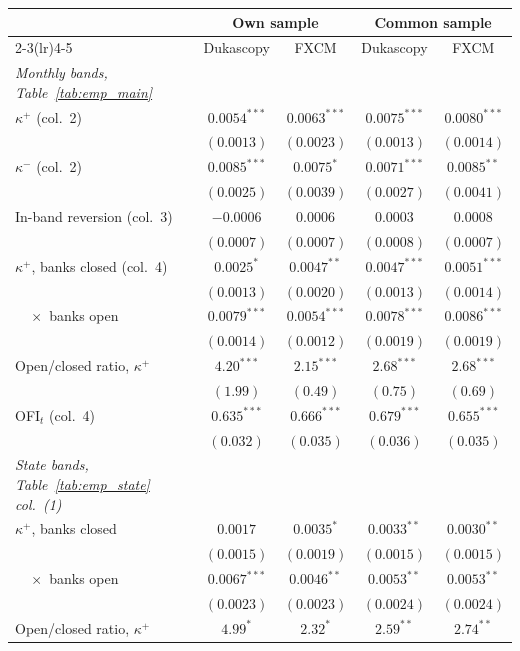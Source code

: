 \begin{tabular}{lcccc}
\toprule
 & \multicolumn{2}{c}{Own sample} & \multicolumn{2}{c}{Common sample} \\
\cmidrule(lr){2-3}\cmidrule(lr){4-5}
 & Dukascopy & FXCM & Dukascopy & FXCM \\
\midrule
\emph{Monthly bands, Table~\ref{tab:emp_main}} & & & & \\
$\kappa^+$ (col.\ 2) & $0.0054^{***}$ & $0.0063^{***}$ & $0.0075^{***}$ & $0.0080^{***}$ \\
 & $(0.0013)$ & $(0.0023)$ & $(0.0013)$ & $(0.0014)$ \\
$\kappa^-$ (col.\ 2) & $0.0085^{***}$ & $0.0075^{*}$ & $0.0071^{***}$ & $0.0085^{**}$ \\
 & $(0.0025)$ & $(0.0039)$ & $(0.0027)$ & $(0.0041)$ \\
In-band reversion (col.\ 3) & $-0.0006$ & $0.0006$ & $0.0003$ & $0.0008$ \\
 & $(0.0007)$ & $(0.0007)$ & $(0.0008)$ & $(0.0007)$ \\
$\kappa^+$, banks closed (col.\ 4) & $0.0025^{*}$ & $0.0047^{**}$ & $0.0047^{***}$ & $0.0051^{***}$ \\
 & $(0.0013)$ & $(0.0020)$ & $(0.0013)$ & $(0.0014)$ \\
$\quad\times$ banks open & $0.0079^{***}$ & $0.0054^{***}$ & $0.0078^{***}$ & $0.0086^{***}$ \\
 & $(0.0014)$ & $(0.0012)$ & $(0.0019)$ & $(0.0019)$ \\
Open/closed ratio, $\kappa^+$ & $4.20^{***}$ & $2.15^{***}$ & $2.68^{***}$ & $2.68^{***}$ \\
 & $(1.99)$ & $(0.49)$ & $(0.75)$ & $(0.69)$ \\
OFI$_t$ (col.\ 4) & $0.635^{***}$ & $0.666^{***}$ & $0.679^{***}$ & $0.655^{***}$ \\
 & $(0.032)$ & $(0.035)$ & $(0.036)$ & $(0.035)$ \\
\emph{State bands, Table~\ref{tab:emp_state} col.\ (1)} & & & & \\
$\kappa^+$, banks closed & $0.0017$ & $0.0035^{*}$ & $0.0033^{**}$ & $0.0030^{**}$ \\
 & $(0.0015)$ & $(0.0019)$ & $(0.0015)$ & $(0.0015)$ \\
$\quad\times$ banks open & $0.0067^{***}$ & $0.0046^{**}$ & $0.0053^{**}$ & $0.0053^{**}$ \\
 & $(0.0023)$ & $(0.0023)$ & $(0.0024)$ & $(0.0024)$ \\
Open/closed ratio, $\kappa^+$ & $4.99^{*}$ & $2.32^{*}$ & $2.59^{**}$ & $2.74^{**}$ \\

\end{tabular}
